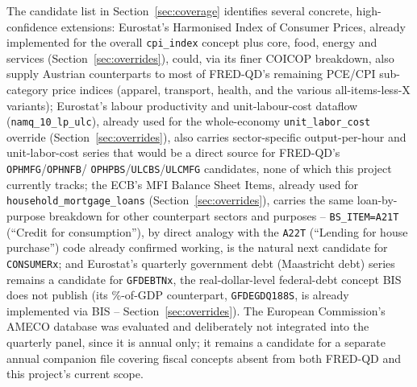 \documentclass[11pt]{article}
\begin{document}
The candidate list in Section~\ref{sec:coverage} identifies several
concrete, high-confidence extensions: Eurostat's Harmonised Index of
Consumer Prices, already implemented for the overall \texttt{cpi\_index}
concept plus core, food, energy and services (Section~\ref{sec:overrides}),
could, via its finer COICOP breakdown, also supply Austrian counterparts
to most of FRED-QD's remaining PCE/CPI sub-category price indices (apparel,
transport, health, and the various all-items-less-X variants); Eurostat's
labour productivity and unit-labour-cost dataflow
(\texttt{namq\_10\_lp\_ulc}), already used for the whole-economy
\texttt{unit\_labor\_cost} override (Section~\ref{sec:overrides}), also
carries sector-specific output-per-hour and unit-labor-cost series that
would be a direct source for FRED-QD's \texttt{OPHMFG}/\texttt{OPHNFB}/
\texttt{OPHPBS}/\texttt{ULCBS}/\texttt{ULCMFG} candidates, none of which
this project currently tracks; the ECB's MFI Balance Sheet Items, already
used for \texttt{household\_mortgage\_loans} (Section~\ref{sec:overrides}),
carries the same loan-by-purpose breakdown for other counterpart sectors
and purposes -- \texttt{BS\_ITEM=A21T} (``Credit for consumption''), by
direct analogy with the \texttt{A22T} (``Lending for house purchase'')
code already confirmed working, is the natural next candidate for
\texttt{CONSUMERx}; and Eurostat's quarterly government debt (Maastricht
debt) series remains a candidate for \texttt{GFDEBTNx}, the
real-dollar-level federal-debt concept BIS does not publish (its
\%-of-GDP counterpart, \texttt{GFDEGDQ188S}, is already implemented via
BIS -- Section~\ref{sec:overrides}). The European Commission's AMECO
database was
evaluated and deliberately not integrated into the quarterly panel, since
it is annual only; it remains a candidate for a separate annual companion
file covering fiscal concepts absent from both FRED-QD and this project's
current scope.
\end{document}
